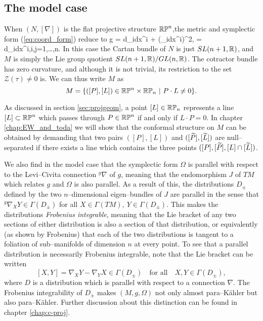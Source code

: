 \subsection{The model case} \label{sec:intro_model}
When $(N,[\nabla])$ is the flat projective structure $\mathbb{RP}^n$,the metric and symplectic form (\ref{eq:coord_form}) reduce to
\be \label{eq:intro_model_g}
g = d\zeta_i\odot dx^i + (\zeta_idx^i)^2, \quad \Omega = d\zeta_i\wedge dx^i,\quad i,j=1,\dots,n.
\ee
In this case the Cartan bundle of $N$ is just $SL(n+1,\mathbb{R})$, and $M$ is simply the Lie group quotient $SL(n+1,\mathbb{R})/GL(n,\mathbb{R})$. The cotractor bundle has zero curvature, and although it is not trivial, its restriction to the set $\mathcal{Z}(\tau)\neq 0$ is. %
We can thus write $M$ as
\[
M=\{([P],[L])\in\RP^n\times\RP_n\ |\ P\cdot L\neq 0\}.
\]

As discussed in section \ref{sec:projgeom}, a point $[L]\in\mathbb{RP}_n$ represents a line $[L]\subset\mathbb{RP}^n$ which passes through $P\in\mathbb{RP}^n$ if and only if $L\cdot P=0$. In chapter \ref{chap:EW_and_toda} we will show that the conformal structure on $M$ can be obtained by demanding that two pairs $([P], [L])$ and $([\widetilde{P}], [\widetilde{L}])$ are null--separated if there exists a line which contains the three points $([P], [\widetilde{P}], [L]\cap [\widetilde{L}])$.

We also find in the model case that the symplectic form $\Omega$ is parallel with respect to the Levi--Civita connection $^g\nabla$ of $g$, meaning that the endomorphism $J$ of $TM$ which relates $g$ and $\Omega$ is also parallel. As a result of this, the distributions $D_\pm$ defined by the two $n$--dimensional eigen--bundles of $J$ are parallel in the sense that $^g\nabla_XY\in\Gamma(D_\pm)$ for all $X\in \Gamma(TM),\ Y\in\Gamma(D_\pm)$. This makes the distributions \textit{Frobenius integrable}, meaning that the Lie bracket of any two sections of either distribution is also a section of that distribution, or equivalently (as shown by Frobenius) that each of the two distributions is tangent to a foliation of sub--manifolds of dimension $n$ at every point. To see that a parallel distribution is necessarily Frobenius integrable, note that the Lie bracket can be written
\[
[X,Y]= \nabla_XY- \nabla_YX\in\Gamma(D_\pm)\quad\mbox{for all}\quad X,Y\in\Gamma(D_\pm),
\]
where $D$ is a distribution which is parallel with respect to a connection $\nabla$. The Frobenius integrability of $D_\pm$ makes $(M,g,\Omega)$ not only almost para--K\"ahler but also para--K\"ahler. Further discussion about this distinction can be found in chapter \ref{chap:c-proj}.